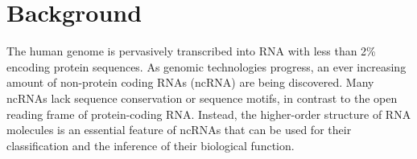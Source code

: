 \documentclass{bmcart}
\begin{document}
\begin{frontmatter}
\begin{abstractbox}

\begin{keyword}
\end{keyword}


\end{abstractbox}
%

\end{frontmatter}





\section*{Background}

The human genome is pervasively transcribed into RNA with less than 2\%
encoding protein sequences. As genomic technologies progress, an ever
increasing amount of non-protein coding RNAs (ncRNA) are being discovered. Many
ncRNAs lack sequence conservation or sequence motifs, in contrast to the open
reading frame of protein-coding RNA. Instead, the higher-order structure of RNA
molecules is an essential feature of ncRNAs that can be used for their
classification and the inference of their biological function. \\
\end{document}
